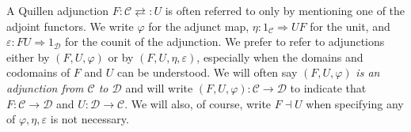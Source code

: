 \begin{notation}\label{3.1.3}
	A Quillen adjunction $F : \mathcal{C} \rightleftarrows : U$ is often referred to only by mentioning one of the adjoint functors. We write $\varphi$ for the adjunct map, $\eta : 1_\mathcal{C}  \Rightarrow UF$ for the unit, and $\varepsilon : FU \Rightarrow 1_\mathcal{D} $ for the counit of the adjunction. We prefer to refer to adjunctions either by $(F,U,\varphi)$ or by $(F,U,\eta,\varepsilon )$, especially when the domains and codomains of $F$ and $U$ can be understood. We will often say $(F,U,\varphi)$ \emph{is an adjunction from $\mathcal{C} $ to $\mathcal{D} $} and will write $(F,U,\varphi): \mathcal{C}  \to \mathcal{D} $ to indicate that $F : \mathcal{C}  \to \mathcal{D} $ and $U : \mathcal{D}  \to \mathcal{C} $. We will also, of course, write $F\dashv U$ when specifying any of $\varphi,\eta,\varepsilon $ is not necessary.
\end{notation}

